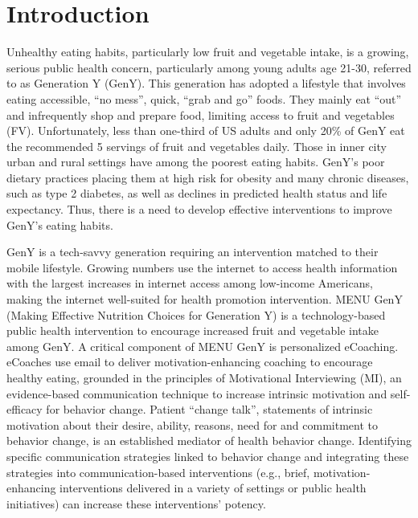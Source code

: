 \documentclass{amia}
\begin{document}
\section*{Introduction}
Unhealthy eating habits, particularly low fruit and vegetable intake, is a growing, serious public health concern, particularly among young adults age 21-30, referred to as Generation Y (GenY)\cite{blanck2008trends,centers2007fruit}. This generation has adopted a lifestyle that involves eating accessible, ``no mess'', quick, ``grab and go'' foods\cite{nebeling2007still,brug1999application}. They mainly eat ``out'' and infrequently shop and prepare food, limiting access to fruit and vegetables (FV)\cite{nelson2009improving,larson2006food}. Unfortunately, less than one-third of US adults\cite{blanck2008trends,ogden2006prevalence} and only 20\% of GenY\cite{blanck2008trends,american2006american,thompson2005dietary} eat the recommended 5 servings of fruit and vegetables daily. Those in inner city urban and rural settings have among the poorest eating habits\cite{blanck2008trends,centers2007fruit,ogden2006prevalence,american2006american,thompson2005dietary}. GenY's poor dietary practices placing them at high risk for obesity and many chronic diseases, such as type 2 diabetes, as well as declines in predicted health status and life expectancy. Thus, there is a need to develop effective interventions to improve GenY's eating habits.

GenY is a tech-savvy generation requiring an intervention matched to their mobile lifestyle. Growing numbers use the internet to access health information with the largest increases in internet access among low-income Americans, making the internet well-suited for health promotion intervention\cite{strecher2007internet}. MENU GenY\cite{alexander2017motivations} (Making Effective Nutrition Choices for Generation Y) is a technology-based public health intervention to encourage increased fruit and vegetable intake among GenY. A critical component of MENU GenY is personalized eCoaching. eCoaches use email to deliver motivation-enhancing coaching to encourage healthy eating, grounded in the principles of Motivational Interviewing (MI), an evidence-based communication technique to increase intrinsic motivation and self-efficacy for behavior change\cite{miller2012motivational,miller2009ten,miller2009toward}. Patient ``change talk'', statements of intrinsic motivation about their desire, ability, reasons, need for and commitment to behavior change, is an established mediator of health behavior change\cite{apodaca2009mechanisms}. Identifying specific communication strategies linked to behavior change and integrating these strategies into communication-based interventions (e.g., brief, motivation-enhancing interventions delivered in a variety of settings or public health initiatives) can increase these interventions' potency.
\end{document}
